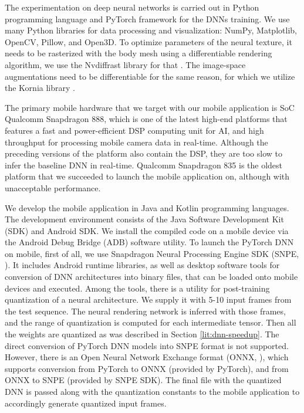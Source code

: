The experimentation on deep neural networks is carried out in Python programming language and PyTorch framework for the DNNs training. We use many Python libraries for data processing and visualization: NumPy, Matplotlib, OpenCV, Pillow, and Open3D. To optimize parameters of the neural texture, it needs to be rasterized with the body mesh using a differentiable rendering algorithm, we use the Nvdiffrast library for that \cite{aux:nvdiffrast20}. The image-space augmentations need to be differentiable for the same reason, for which we utilize the Kornia library \cite{aux:kornia20}.

The primary mobile hardware that we target with our mobile application is SoC Qualcomm Snapdragon 888, which is one of the latest high-end platforms that features a fast and power-efficient DSP computing unit for AI, and high throughput for processing mobile camera data in real-time. Although the preceding versions of the platform also contain the DSP, they are too slow to infer the baseline DNN in real-time. Qualcomm Snapdragon 835 is the oldest platform that we succeeded to launch the mobile application on, although with unacceptable performance.

We develop the mobile application in Java and Kotlin programming languages. The development environment consists of the Java Software Development Kit (SDK) and Android SDK. We install the compiled code on a mobile device via the Android Debug Bridge (ADB) software utility. To launch the PyTorch DNN on mobile, first of all, we use Snapdragon Neural Processing Engine SDK (SNPE, \cite{aux:snpe}). It includes Android runtime libraries, as well as desktop software tools for conversion of DNN architectures into binary files, that can be loaded onto mobile devices and executed. Among the tools, there is a utility for post-training quantization of a neural architecture. We supply it with 5-10 input frames from the test sequence. The neural rendering network is inferred with those frames, and the range of quantization is computed for each intermediate tensor. Then all the weights are quantized as was described in Section \ref{lit:dnn-speedup}. The direct conversion of PyTorch DNN models into SNPE format is not supported. However, there is an Open Neural Network Exchange format (ONNX, \cite{aux:onnx}), which supports conversion from PyTorch to ONNX (provided by PyTorch), and from ONNX to SNPE (provided by SNPE SDK). The final file with the quantized DNN is passed along with the quantization constants to the mobile application to accordingly generate quantized input frames.

